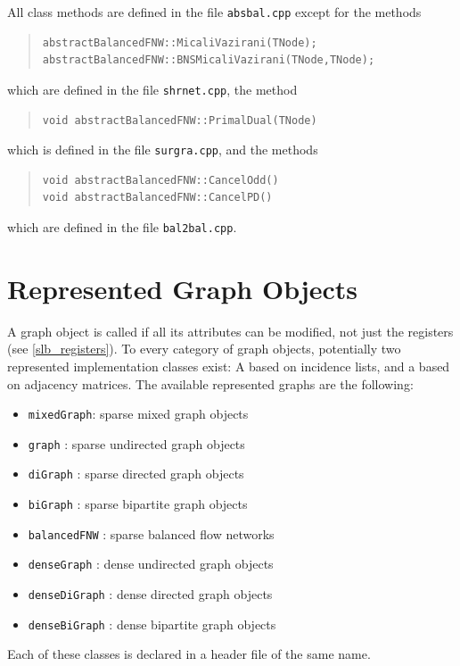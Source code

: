 \documentclass[a4paper,11pt,twoside]{book}
\begin{document}
\begin{multicols}{2}
All class methods are defined in the file \verb/absbal.cpp/ except for the
methods
\begin{quote}
\begin{verbatim}
abstractBalancedFNW::MicaliVazirani(TNode);
abstractBalancedFNW::BNSMicaliVazirani(TNode,TNode);
\end{verbatim}
\end{quote}
which are defined in the file \verb/shrnet.cpp/, the method
\begin{quote}
\begin{verbatim}
void abstractBalancedFNW::PrimalDual(TNode)
\end{verbatim}
\end{quote}
which is defined in the file \verb/surgra.cpp/, and the methods
\begin{quote}
\begin{verbatim}
void abstractBalancedFNW::CancelOdd()
void abstractBalancedFNW::CancelPD()
\end{verbatim}
\end{quote}
which are defined in the file \verb/bal2bal.cpp/.



\section{Represented Graph Objects}

A graph object is called  if all
its attributes can be modified, not just the registers (see \ref{slb_registers}).
To every category of graph objects, potentially two represented implementation
classes exist: A  based on incidence lists, and a
 based on adjacency matrices. The available represented
graphs are the following:
\begin{itemize}
\item \verb/mixedGraph/: sparse mixed graph objects
\item \verb/graph/     : sparse undirected graph objects
\item \verb/diGraph/   : sparse directed graph objects
\item \verb/biGraph/   : sparse bipartite graph objects
\item \verb/balancedFNW/ : sparse balanced flow networks
\item \verb/denseGraph/  : dense undirected graph objects
\item \verb/denseDiGraph/ : dense directed graph objects
\item \verb/denseBiGraph/ : dense bipartite graph objects
\end{itemize}
Each of these classes is declared in a header file of the same name.


\end{multicols}
\end{document}
